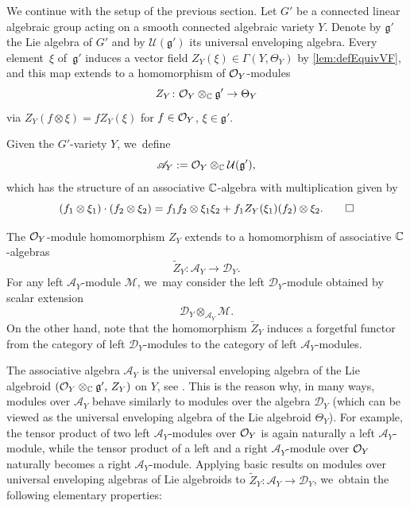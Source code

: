 \documentclass[11pt]{article}
\newcommand{\cA}{\mathscr{A}}
\newcommand{\frg}{\mathfrak{g}}
\begin{document}
We continue with the setup of the previous section. Let $G'$ be a connected linear algebraic group acting on a smooth connected algebraic variety $Y$. Denote by $\frg'$ the Lie algebra of $G'$ and by $\mathcal U(\frg')$ its universal enveloping algebra. Every element~$\xi$ of~$\frg'$ induces a vector field $Z_Y(\xi) \in \Gamma(Y,\Theta_Y)$ by \cref{lem:defEquivVF}, and this map extends to a homomorphism of $\mathcal{O}_Y$\nobreakdash-mod\-ules
\[
Z_Y \colon \O_Y \otimes_\C \frg' \to \Theta_Y
\]
via $Z_Y(f \otimes \xi) = f Z_Y(\xi)$ for $f \in \mathcal{O}_Y$, $\xi \in \frg'$.

\begin{dfn} \label{def:A}
Given the $G'$-variety $Y$, we~define
\[
\cA_Y := \O_Y \otimes_\C \mathcal U(\frg'),
\]
which has the structure of an associative ${\mathbb C}$-algebra with multiplication given by
\[
(f_1 \otimes \xi_1) \cdot (f_2 \otimes \xi_2) = f_1 f_2 \otimes \xi_1 \xi_2 + f_1 Z_Y(\xi_1)(f_2) \otimes \xi_2.\qedhere
\]
\end{dfn}

The $\mathcal{O}_Y$\nobreakdash-mod\-ule homomorphism $Z_Y$ extends to a homomorphism of associative ${\mathbb C}$-algebras
\[
\tilde{Z}_Y \colon \cA_Y \to \mathscr D_Y.
\]
For any left $\cA_Y$\nobreakdash-mod\-ule $\mathcal M$, we~may consider the left $\mathscr{D}_Y$\nobreakdash-mod\-ule obtained by scalar extension
\[
\mathscr{D}_Y \otimes_{\cA_Y} \mathcal{M}.
\]
On the other hand, note that the homomorphism $\tilde{Z}_Y$ induces a forgetful functor from the category of left $\mathscr{D}_Y$\nobreakdash-mod\-ules to the category of left $\cA_Y$\nobreakdash-mod\-ules.

The associative algebra $\cA_Y$ is the universal enveloping algebra of the Lie algebroid $(\O_Y \otimes_\C \frg',\, Z_Y)$ on $Y$, see \cite[1.8.4.\,Ex.]{BeilinsonBernstein_Jantzen}. This is the reason why, in many ways, modules over $\cA_Y$ behave similarly to modules over the algebra $\mathscr{D}_Y$ (which can be viewed as the universal enveloping algebra of the Lie algebroid $\Theta_Y$). For example, the tensor product of two left $\cA_Y$\nobreakdash-mod\-ules over $\mathcal{O}_Y$ is again naturally a left $\cA_Y$\nobreakdash-mod\-ule, while the tensor product of a left and a right $\cA_Y$\nobreakdash-mod\-ule over $\mathcal{O}_Y$ naturally becomes a right $\cA_Y$\nobreakdash-mod\-ule. Applying basic results on modules over universal enveloping algebras of Lie algebroids \cite[App.]{CN05} to $\tilde{Z}_Y \colon \cA_Y \to \mathscr{D}_Y$, we~obtain the following elementary properties:
\end{document}
